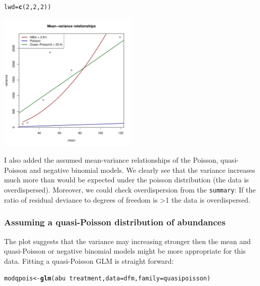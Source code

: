 \documentclass{scrartcl}\usepackage[]{graphicx}\usepackage[]{color}
\makeatletter
\newcommand{\hlnum}[1]{\textcolor[rgb]{0.686,0.059,0.569}{#1}}%
\newcommand{\hlopt}[1]{\textcolor[rgb]{0,0,0}{#1}}%
\newcommand{\hlstd}[1]{\textcolor[rgb]{0.345,0.345,0.345}{#1}}%
\newcommand{\hlkwb}[1]{\textcolor[rgb]{0.69,0.353,0.396}{#1}}%
\newcommand{\hlkwc}[1]{\textcolor[rgb]{0.333,0.667,0.333}{#1}}%
\newcommand{\hlkwd}[1]{\textcolor[rgb]{0.737,0.353,0.396}{\textbf{#1}}}%
\newenvironment{kframe}{%
 \def\at@end@of@kframe{}%
 \ifinner\ifhmode%
  \def\at@end@of@kframe{\end{minipage}}%
  \begin{minipage}{\columnwidth}%
 \fi\fi%
 \def\FrameCommand##1{\hskip\@totalleftmargin \hskip-\fboxsep
 \colorbox{shadecolor}{##1}\hskip-\fboxsep
     \hskip-\linewidth \hskip-\@totalleftmargin \hskip\columnwidth}%
 \MakeFramed {\advance\hsize-\width
   \@totalleftmargin\z@ \linewidth\hsize
   \@setminipage}}%
 {\par\unskip\endMakeFramed%
 \at@end@of@kframe}
\newenvironment{knitrout}{}{} %
\makeatother
\begin{document}
\begin{knitrout}
\begin{kframe}
\begin{alltt}
       \hlkwc{lwd} \hlstd{=} \hlkwd{c}\hlstd{(}\hlnum{2}\hlstd{,}\hlnum{2}\hlstd{,} \hlnum{2}\hlstd{))}
\end{alltt}
\end{kframe}
\includegraphics[width=0.5\textwidth]{figure/mod_count_meanvar-1} 

\end{knitrout}

I also added the assumed mean-variance relationships of the Poisson, quasi-Poisson and negative binomial models.
We clearly see that the variance increases much more than would be expected under the poisson distribution (the data is overdispersed).
Moreover, we could check overdispersion from the \texttt{summary}:
If the ratio of residual deviance to degrees of freedom is \textgreater 1 the data is overdispersed.


\subsubsection{Assuming a quasi-Poisson distribution of abundances}
The plot suggests that the variance may increasing stronger then the mean and quasi-Poisson or negative binomial models might be more appropriate for this data.
Fitting a quasi-Poisson GLM is straight forward:
\begin{knitrout}
\color{fgcolor}\begin{kframe}
\begin{alltt}
\hlstd{modqpois} \hlkwb{<-} \hlkwd{glm}\hlstd{(abu} \hlopt{~} \hlstd{treatment,} \hlkwc{data} \hlstd{= dfm,} \hlkwc{family} \hlstd{= quasipoisson)}
\end{alltt}
\end{kframe}
\end{knitrout}
\end{document}
